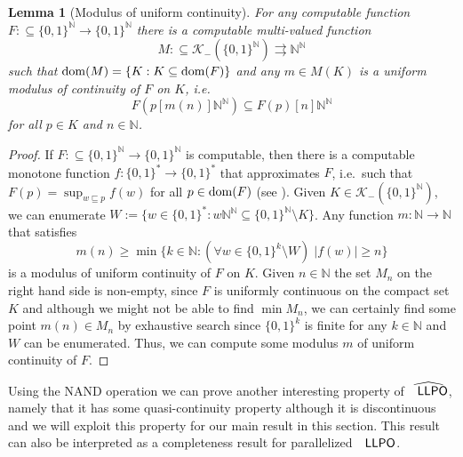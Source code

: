 \documentclass[jsl,10pt]{noasl}
\def\KK{{\mathcal K}}
\def\IN{{\mathbb{N}}}
\def\In{\subseteq}
\def\prefix{\sqsubseteq}
\def\mto{\rightrightarrows}
\def\dom{{\rm dom}}
\def\LLPO{\text{\rm\sffamily LLPO}}
\def\LLPO{\text{\rm\sffamily LLPO}}
\newtheorem{lemma}[proposition]{Lemma}
\begin{document}
\begin{lemma}[Modulus of uniform continuity]
\label{lem:modulus}
For any computable function\linebreak $F:\In\{0,1\}^\IN\to\{0,1\}^\IN$
there is a computable multi-valued function
\[M:\In\KK_-(\{0,1\}^\IN)\mto\IN^\IN\]
such that $\dom(M)=\{K:K\In\dom(F)\}$ and any $m\in M(K)$ is 
a uniform modulus of continuity of $F$ on $K$, i.e.\
\[F(p[m(n)]\IN^\IN)\In F(p)[n]\IN^\IN\]
for all $p\in K$ and $n\in\IN$.
\end{lemma}
\begin{proof}
If $F:\In\{0,1\}^\IN\to\{0,1\}^\IN$ is computable, then there is
a computable monotone function $f:\{0,1\}^*\to\{0,1\}^*$ that
approximates $F$, i.e.\ such that $F(p)=\sup_{w\prefix p}f(w)$
for all $p\in\dom(F)$ (see \cite{Wei00}). Given $K\in\KK_-(\{0,1\}^\IN)$,
we can enumerate $W:=\{w\in\{0,1\}^*:w\IN^\IN\In\{0,1\}^\IN\setminus K\}$.
Any function $m:\IN\to\IN$ that satisfies
\[m(n)\geq\min\{k\in\IN:(\forall w\in\{0,1\}^k\setminus W)\;|f(w)|\geq n\}\]
is a modulus of uniform continuity of $F$ on $K$. Given $n\in\IN$ the set 
$M_n$ on the right hand side is non-empty, since $F$ is uniformly continuous 
on the compact set $K$ and although we might not be able to find 
$\min M_n$, we can certainly find some point $m(n)\in M_n$ by exhaustive search 
since $\{0,1\}^k$ is finite for any $k\in\IN$ and $W$ can be enumerated.
Thus, we can compute some modulus $m$ of uniform continuity of $F$.
\end{proof}

Using the NAND operation we can prove another interesting property of $\widehat{\LLPO}$,
namely that it has some quasi-continuity property although it is discontinuous 
and we will exploit this property for our main result in this section.
This result can also be interpreted as a completeness result for parallelized $\LLPO$.
\end{document}

